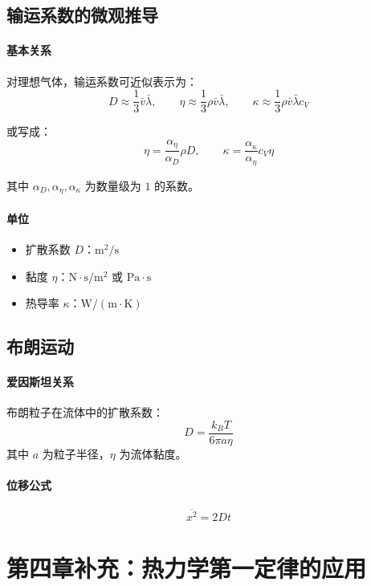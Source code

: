 \documentclass[UTF8]{ctexart}
\begin{document}
\subsection{输运系数的微观推导}

\paragraph{基本关系}
对理想气体，输运系数可近似表示为：
\[
\boxed{D\approx\frac{1}{3}\bar{v}\bar{\lambda}},\qquad
\boxed{\eta\approx\frac{1}{3}\rho\bar{v}\bar{\lambda}},\qquad
\boxed{\kappa\approx\frac{1}{3}\rho\bar{v}\bar{\lambda}c_V}
\]

或写成：
\[
\eta=\frac{\alpha_\eta}{\alpha_D}\rho D,\qquad
\kappa=\frac{\alpha_\kappa}{\alpha_\eta}c_V\eta
\]

其中 $\alpha_D,\alpha_\eta,\alpha_\kappa$ 为数量级为 $1$ 的系数。

\paragraph{单位}
\begin{itemize}[leftmargin=2em]
  \item 扩散系数 $D$：$\mathrm{m^2/s}$
  \item 黏度 $\eta$：$\mathrm{N\cdot s/m^2}$ 或 $\mathrm{Pa\cdot s}$
  \item 热导率 $\kappa$：$\mathrm{W/(m\cdot K)}$
\end{itemize}

\subsection{布朗运动}

\paragraph{爱因斯坦关系}
布朗粒子在流体中的扩散系数：
\[
\boxed{D=\frac{k_B T}{6\pi a\eta}}
\]
其中 $a$ 为粒子半径，$\eta$ 为流体黏度。

\paragraph{位移公式}
\[
\boxed{\overline{x^2}=2Dt}
\]

\section{第四章补充：热力学第一定律的应用}
\end{document}
